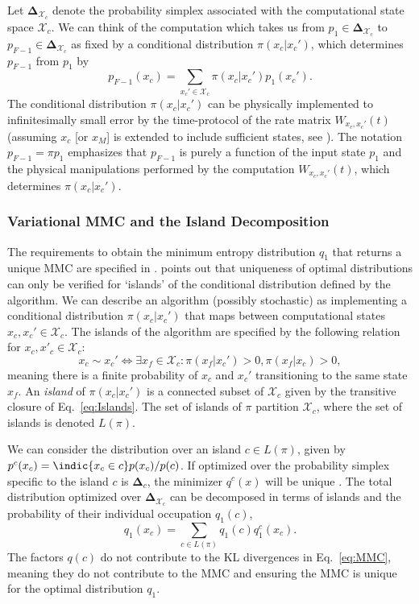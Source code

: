 \documentclass[12pt,onecolumn, margin=1in]{IEEEtran}
\newcommand{\compsimplex}{\boldsymbol{\Delta}_{\mathcal{X}_c}}
\begin{document}
Let $\compsimplex$ denote the probability simplex associated with the computational state space $\mathcal{X}_c$. We can think of the computation which takes us from $p_1 \in \compsimplex$ to $p_{F-1} \in \compsimplex$ as fixed by a conditional distribution $\pi(x_c|x_c')$, which determines $p_{F-1}$ from $p_1$ by
\begin{equation}
    p_{F-1}(x_c) = \sum_{x_c'\in \mathcal{X}_c} \pi(x_c|x_c') p_1(x_c').
\end{equation}
The conditional distribution $\pi(x_c|x_c')$ can be physically implemented to infinitesimally small error by the time-protocol of the rate matrix $W_{x_c,x_c'}(t)$ \cite[p. 23]{Wolpert2019}\cite{Owen_2019} (assuming $x_c$ [or $x_M$] is extended to include sufficient states, see \cite{Owen_2019}). The notation $p_{F-1} = \pi p_1$ emphasizes that $p_{F-1}$ is purely a function of the input state $p_1$ and the physical manipulations performed by the computation $W_{x_c,x_c'}(t)$, which determines $\pi(x_c|x_c')$.

\subsubsection{Variational MMC and the Island Decomposition}

The requirements to obtain the minimum entropy distribution $q_1$ that returns a unique MMC are specified in \cite{Wolpert_2020}. \cite{Wolpert_2020} points out that uniqueness of optimal distributions can only be verified for `islands' of the conditional distribution defined by the algorithm. 
We can describe an algorithm (possibly stochastic) as implementing a conditional distribution $\pi(x_c | x_c')$ that maps between computational states $x_c,x_c' \in \mathcal{X}_c$. The islands of the algorithm are specified by the following relation for $x_c, x'_c \in \mathcal{X}_c$:
\begin{equation}
    \label{eq:Islands}
    x_c \sim x_c' \Leftrightarrow \exists x_f \in \mathcal{X}_c : \pi(x_f|x_c') > 0, \pi(x_f|x_c) > 0,
\end{equation}
meaning there is a finite probability of $x_c$ and $x_c'$ transitioning to the same state $x_f$. An \textit{island} of $\pi(x_c | x_c')$ is a connected subset of $\mathcal{X}_c$ given by the transitive closure of Eq.~\eqref{eq:Islands}. The set of islands of $\pi$ partition $\mathcal{X}_c$, where the set of islands is denoted $L(\pi)$.

We can consider the distribution over an island $c \in L(\pi)$, given by $p^c(x_c) = \indic{x_c \in c}p(x_c)/p(c)$. If optimized over the probability simplex specific to the island $c$ is $\boldsymbol{\Delta}_c$, the minimizer $q^c(x)$ will be unique \cite{Wolpert_2020}. The total distribution optimized over $\compsimplex$ can be decomposed in terms of islands and the probability of their individual occupation $q_1(c)$, 
\begin{equation}
    \label{eq:island_dist}
    q_1(x_c) = \sum_{c \in L(\pi)} q_1(c) q_1^c(x_c).
\end{equation}
The factors $q(c)$ do not contribute to the KL divergences in Eq.~\eqref{eq:MMC}, meaning they do not contribute to the MMC and ensuring the MMC is unique for the optimal distribution $q_1$.
\end{document}

